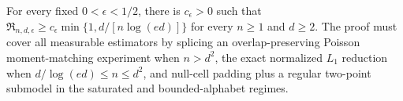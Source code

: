 For every fixed \(0<\epsilon<1/2\), there is \(c_\epsilon>0\) such that \(\mathfrak R_{n,d,\epsilon}\geq c_\epsilon\min\{1,d/[n\log(ed)]\}\) for every \(n\geq1\) and \(d\geq2\). The proof must cover all measurable estimators by splicing an overlap-preserving Poisson moment-matching experiment when \(n>d^2\), the exact normalized \(L_1\) reduction when \(d/\log(ed)\leq n\leq d^2\), and null-cell padding plus a regular two-point submodel in the saturated and bounded-alphabet regimes.